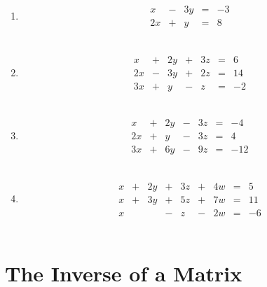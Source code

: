 \documentclass[]{book}
\theoremstyle{definition}
\theoremstyle{definition}
\theoremstyle{definition}
\theoremstyle{remark}
\begin{document}
\begin{enumerate}
        \item
            $$\begin{matrix}
            x  & - & 3y & = & -3\\
            2x & + &  y & = &  8
            \end{matrix}$$
            \phantom{Rank = 2; One solution}\\

        \bigskip

        \item
            $$\begin{matrix}
            x & + & 2y & + & 3z & = & 6\\
            2x& - & 3y & + & 2z & = &14\\
            3x& + & y  & - & z  & = &-2
            \end{matrix}$$
            \phantom{Rank = 3; One solution}\\

        \bigskip

        \item
            $$\begin{matrix}
            x & + & 2y & - & 3z & = & -4\\
            2x& + & y  & - & 3z & = & 4\\
            3x & + & 6y & - & 9z & = & -12 
            \end{matrix}$$
            \phantom{Rank = 2; Infinite solutions}\\

        \bigskip

        \item
            $$\begin{matrix}
            x &+& 2y &+& 3z &+& 4w &=& 5\\
            x &+& 3y &+& 5z &+& 7w &=& 11\\
            x & &    &-& z  &-& 2w &=&-6
            \end{matrix}$$
            \phantom{Rank = 3; Infinite solutions}\\

\end{enumerate}

\section{The Inverse of a Matrix}\label{the-inverse-of-a-matrix}
\end{document}
